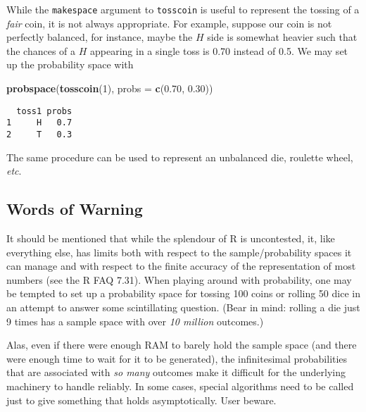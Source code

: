 \documentclass[]{book}
\newenvironment{Shaded}{\begin{snugshade}}{\end{snugshade}}
\newcommand{\KeywordTok}[1]{\textcolor[rgb]{0.13,0.29,0.53}{\textbf{{#1}}}}
\newcommand{\DataTypeTok}[1]{\textcolor[rgb]{0.13,0.29,0.53}{{#1}}}
\newcommand{\DecValTok}[1]{\textcolor[rgb]{0.00,0.00,0.81}{{#1}}}
\newcommand{\FloatTok}[1]{\textcolor[rgb]{0.00,0.00,0.81}{{#1}}}
\newcommand{\NormalTok}[1]{{#1}}
\numberwithin{equation}{chapter}
\numberwithin{figure}{chapter}
\theoremstyle{plain}
\theoremstyle{definition}
\theoremstyle{remark}
\theoremstyle{definition}
\theoremstyle{definition}
\theoremstyle{remark}
\let\BeginKnitrBlock\begin \let\EndKnitrBlock\end
\begin{document}
\bigskip

\BeginKnitrBlock{example}[An unbalanced coin]
\protect\hypertarget{ex:unbalanced-coin}{}{\label{ex:unbalanced-coin}
\iffalse (An unbalanced coin) \fi }While the \texttt{makespace} argument
to \texttt{tosscoin} is useful to represent the tossing of a \emph{fair}
coin, it is not always appropriate. For example, suppose our coin is not
perfectly balanced, for instance, maybe the \(H\) side is somewhat
heavier such that the chances of a \(H\) appearing in a single toss is
0.70 instead of 0.5. We may set up the probability space with
\EndKnitrBlock{example}

\begin{Shaded}
\begin{Highlighting}[]
\KeywordTok{probspace}\NormalTok{(}\KeywordTok{tosscoin}\NormalTok{(}\DecValTok{1}\NormalTok{), }\DataTypeTok{probs =} \KeywordTok{c}\NormalTok{(}\FloatTok{0.70}\NormalTok{, }\FloatTok{0.30}\NormalTok{)) }
\end{Highlighting}
\end{Shaded}

\begin{verbatim}
  toss1 probs
1     H   0.7
2     T   0.3
\end{verbatim}

The same procedure can be used to represent an unbalanced die, roulette
wheel, \emph{etc}.

\subsection{Words of Warning}\label{words-of-warning}

It should be mentioned that while the splendour of R is uncontested, it,
like everything else, has limits both with respect to the
sample/probability spaces it can manage and with respect to the finite
accuracy of the representation of most numbers (see the R FAQ 7.31).
When playing around with probability, one may be tempted to set up a
probability space for tossing 100 coins or rolling 50 dice in an attempt
to answer some scintillating question. (Bear in mind: rolling a die just
9 times has a sample space with over \emph{10 million} outcomes.)

Alas, even if there were enough RAM to barely hold the sample space (and
there were enough time to wait for it to be generated), the
infinitesimal probabilities that are associated with \emph{so many}
outcomes make it difficult for the underlying machinery to handle
reliably. In some cases, special algorithms need to be called just to
give something that holds asymptotically. User beware.
\end{document}
